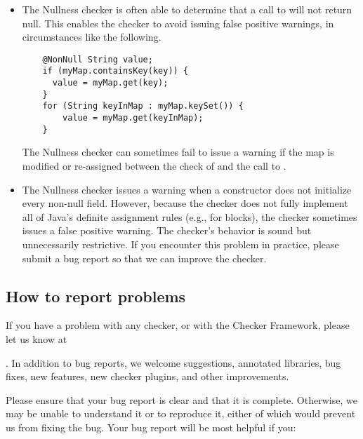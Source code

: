 \begin{itemize}
\item
  The Nullness checker is often able to determine that a call to
   will not return null.  This enables the checker to avoid
  issuing false positive warnings, in circumstances like the following.

\begin{Verbatim}
    @NonNull String value;
    if (myMap.containsKey(key)) {
      value = myMap.get(key);
    }
    for (String keyInMap : myMap.keySet()) {
        value = myMap.get(keyInMap);
    }
\end{Verbatim}

  The Nullness checker can sometimes fail to issue a warning if the map is
  modified or re-assigned between the check of  and the
  call to .



\item 
  The Nullness checker issues a warning when a constructor does not
  initialize every non-null field.  However, because the checker does not
  fully implement all of Java's definite assignment rules (e.g., for
   blocks), the checker sometimes issues a false positive
  warning.  The checker's behavior is sound but unnecessarily restrictive.
  If you encounter this problem in practice, please submit a bug report so
  that we can improve the checker.

\end{itemize}



\subsection{How to report problems\label{reporting-bugs}}

If you have a problem with any checker, or with the Checker Framework,
please let us know at
\begin{smaller}
%
\end{smaller}%
.  In addition
to bug reports, we welcome suggestions, annotated libraries, bug fixes, new
features, new checker plugins, and other improvements.

Please ensure that your bug report is clear and that it is complete.
Otherwise, we may be unable to understand it or to reproduce it, either of
which would prevent us from fixing the bug.  Your bug report will be most
helpful if you:

